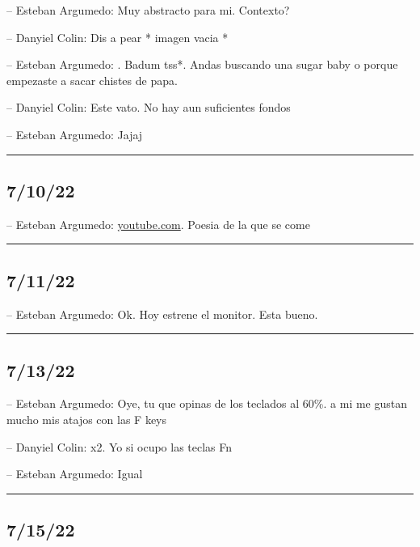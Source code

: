 -- Esteban Argumedo: Muy abstracto para mi. Contexto?

-- Danyiel Colin: Dis a pear * imagen vacia *

-- Esteban Argumedo: . Badum tss*. Andas buscando una sugar baby o
porque empezaste a sacar chistes de papa.

-- Danyiel Colin: Este vato. No hay aun suficientes fondos

-- Esteban Argumedo: Jajaj

\begin{center}\rule{0.5\linewidth}{0.5pt}\end{center}

\hypertarget{section-122}{%
\subsection{7/10/22}\label{section-122}}

-- Esteban Argumedo:
\href{https://youtube.com/shorts/9yLidRj2kiA?feature=share}{youtube.com}.
Poesia de la que se come

\begin{center}\rule{0.5\linewidth}{0.5pt}\end{center}

\hypertarget{section-123}{%
\subsection{7/11/22}\label{section-123}}

-- Esteban Argumedo: Ok. Hoy estrene el monitor. Esta bueno.

\begin{center}\rule{0.5\linewidth}{0.5pt}\end{center}

\hypertarget{section-124}{%
\subsection{7/13/22}\label{section-124}}

-- Esteban Argumedo: Oye, tu que opinas de los teclados al 60\%. a mi me
gustan mucho mis atajos con las F keys

-- Danyiel Colin: x2. Yo si ocupo las teclas Fn

-- Esteban Argumedo: Igual

\begin{center}\rule{0.5\linewidth}{0.5pt}\end{center}

\hypertarget{section-125}{%
\subsection{7/15/22}\label{section-125}}

